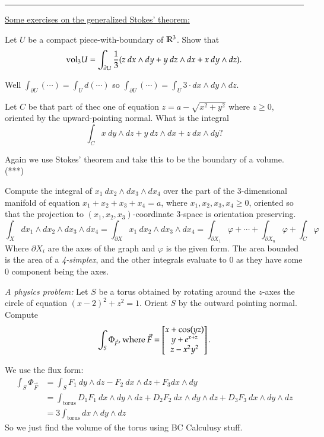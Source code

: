 \vspace{1em}
\hrule

\ul{Some exercises on the generalized Stokes' theorem: }

 Let $U$ be a compact piece-with-boundary of $\mathbb{R}^3$. Show that
\[\Vol_3 U = \int_{\partial U} \frac{1}{3}(z\ dx\wedge dy + y\ dz\wedge dx + x\ dy\wedge dz). \]

Well $\int_{\partial U} (\cdots) = \int_{U} d(\cdots)$ so $\int_{\partial U} (\cdots) = \int_{U} 3\cdot dx\wedge dy\wedge dz$.

 Let $C$ be that part of thec one of equation $z=a-\sqrt{x^2+y^2}$ where $z\geq 0$, oriented by the upward-pointing normal. What is the integral
\[\int_C x\ dy\wedge dz + y\ dz\wedge dx + z\ dx\wedge dy?\]

Again we use Stokes' theorem and take this to be the boundary of a volume. (***)

 Compute the integral of $x_1\ dx_2\wedge dx_3\wedge dx_4$ over the part of the 3-dimensional manifold of equation $x_1+x_2+x_3+x_4=a$, where $x_1,x_2,x_3,x_4\geq 0$, oriented so that the projection to $(x_1,x_2,x_3)$-coordinate $3$-space is orientation preserving. 
\[\int_{X}dx_1\wedge dx_2\wedge dx_3\wedge dx_4=\int_{\partial X} x_1\ dx_2\wedge dx_3\wedge dx_4=\int_{\partial X_1}\varphi + \cdots + \int_{\partial X_n}\varphi + \int_{C}\varphi\]
Where $\partial X_i$ are the axes of the graph and $\varphi$ is the given form. The area bounded is the area of a \emph{4-simplex}, and the other integrals evaluate to $0$ as they have some $0$ component being the axes. 

\emph{A physics problem:}  Let $S$ be a torus obtained by rotating around the $z$-axes the circle of equation $(x-2)^2+z^2=1$. Orient $S$ by the outward pointing normal. Compute
\[\int_{S}\Phi_{\vec{F}}\text{, where }\vec{F}=\begin{bmatrix} x+\cos(yz) \\ y+e^{x+z}\\ z-x^2y^2 \end{bmatrix}.\]

We use the flux form: 
\begin{align*}
	\int_S \Phi_{\vec{F}}&=\int_S F_1\ dy\wedge dz - F_2\ dx\wedge dz + F_3 dx\wedge dy \\
	&= \int_{\mathrm{torus}} D_1F_1\ dx\wedge dy\wedge dz + D_2F_2\ dx\wedge dy\wedge dz + D_3F_3\ dx\wedge dy\wedge dz \\
	&= 3\int_{\mathrm{torus}} dx\wedge dy\wedge dz
\end{align*}
So we just find the volume of the torus using BC Calculusy stuff. 
